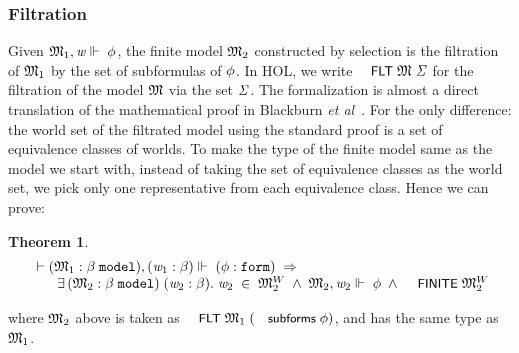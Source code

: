 \documentclass{llncs}
\newtheorem{thm}{Theorem}[chapter]
\newenvironment{holmath}{\begin{displaymath}\begin{array}{l}}{\end{array}\end{displaymath}\ignorespacesafterend}
\renewcommand{\HOLConst}[1]{{\textsf{\upshape\small #1}}}
\renewcommand{\HOLinline}[1]{\ensuremath{#1}}
\begin{document}
\subsubsection{Filtration}
Given \HOLinline{\HOLFreeVar{\ensuremath{\mathfrak{M}}}\sb{\mathrm{1}},\HOLFreeVar{w}\ensuremath{\Vdash}\;\HOLFreeVar{\ensuremath{\phi}}}, the finite model \HOLinline{\HOLFreeVar{\ensuremath{\mathfrak{M}}}\sb{\mathrm{2}}} constructed by selection is the filtration of \HOLinline{\HOLFreeVar{\ensuremath{\mathfrak{M}}}\sb{\mathrm{1}}} by the set of subformulas of \HOLinline{\HOLFreeVar{\ensuremath{\phi}}}. In HOL, we write \HOLinline{\HOLConst{FLT}\;\HOLFreeVar{\ensuremath{\mathfrak{M}}}\;\HOLFreeVar{\ensuremath{\Sigma}}} for the filtration of the model \HOLinline{\HOLFreeVar{\ensuremath{\mathfrak{M}}}} via the set \HOLinline{\HOLFreeVar{\ensuremath{\Sigma}}}. The formalization is almost a direct translation of the mathematical proof in Blackburn \emph{et al}~\cite{Blackburn}. For the only difference: the world set of the filtrated model using the standard proof is a set of equivalence classes of worlds. To make the type of the finite model same as the model we start with, instead of taking the set of equivalence classes as the world set, we pick only one representative from each equivalence class. Hence we can prove:
\begin{thm}
{\upshape\cite[Theorem 2.41 (Finite model property, via filtration)]{Blackburn}}
\begin{holmath}
  \ensuremath{\HOLTokenTurnstile}(\HOLFreeVar{\ensuremath{\mathfrak{M}}}\sb{\mathrm{1}} :\ensuremath{\beta}\;\HOLTyOp{model}),(\HOLFreeVar{w}\sb{\mathrm{1}} :\ensuremath{\beta})\ensuremath{\Vdash}\;(\HOLFreeVar{\ensuremath{\phi}} :\HOLTyOp{form})\;\HOLSymConst{\HOLTokenImp{}}\\
\;\;\;\;\;\;\;\HOLSymConst{\HOLTokenExists{}}(\HOLBoundVar{\ensuremath{\mathfrak{M}}}\sb{\mathrm{2}} :\ensuremath{\beta}\;\HOLTyOp{model})\;(\HOLBoundVar{w}\sb{\mathrm{2}} :\ensuremath{\beta}).\;\HOLBoundVar{w}\sb{\mathrm{2}}\;\HOLSymConst{\HOLTokenIn{}}\;\HOLBoundVar{\ensuremath{\mathfrak{M}}}\sb{\mathrm{2}}\HOLSymConst{\ensuremath{\sp{W}}}\;\HOLSymConst{\HOLTokenConj{}}\;\HOLBoundVar{\ensuremath{\mathfrak{M}}}\sb{\mathrm{2}},\HOLBoundVar{w}\sb{\mathrm{2}}\ensuremath{\Vdash}\;\HOLFreeVar{\ensuremath{\phi}}\;\HOLSymConst{\HOLTokenConj{}}\;\HOLConst{FINITE}\;\HOLBoundVar{\ensuremath{\mathfrak{M}}}\sb{\mathrm{2}}\HOLSymConst{\ensuremath{\sp{W}}}
\end{holmath}
\end{thm}
where \HOLinline{\HOLFreeVar{\ensuremath{\mathfrak{M}}}\sb{\mathrm{2}}} above is taken as \HOLinline{\HOLConst{FLT}\;\HOLFreeVar{\ensuremath{\mathfrak{M}}}\sb{\mathrm{1}}\;(\HOLConst{subforms}\;\HOLFreeVar{\ensuremath{\phi}})}, and has the same type as \HOLinline{\HOLFreeVar{\ensuremath{\mathfrak{M}}}\sb{\mathrm{1}}}. 
\end{document}
